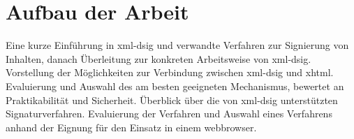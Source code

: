 \section{Aufbau der Arbeit}
\label{sec:Einleitung:aufbau}
Eine kurze Einführung in \gls{xml-dsig} und verwandte Verfahren zur Signierung von Inhalten, danach Überleitung zur konkreten Arbeitsweise von \gls{xml-dsig}.
Vorstellung der Möglichkeiten zur Verbindung zwischen \gls{xml-dsig} und \gls{xhtml}. Evaluierung und Auswahl des am besten geeigneten Mechanismus, bewertet an
Praktikabilität und Sicherheit. Überblick über die von \gls{xml-dsig} unterstützten Signaturverfahren. Evaluierung der Verfahren und Auswahl eines Verfahrens
anhand der Eignung für den Einsatz in einem \gls{webbrowser}.

